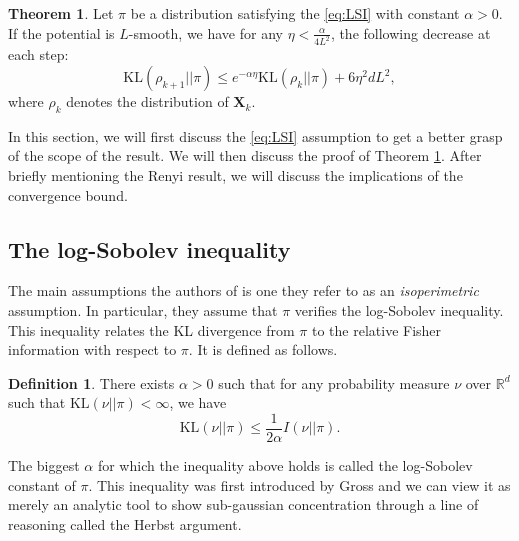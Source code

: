 \documentclass[11pt,twoside]{article}
\theoremstyle{definition}
\newtheorem{definition}{Definition}[section]
\newtheorem{theorem}{Theorem}[section]
\newcommand{\R}{\mathbb{R}}
\newcommand{\bX}{\mathbf{X}}
\newcommand{\KL}{\text{KL}}
\begin{document}
\begin{boxF}
\begin{theorem}
Let $\pi$ be a distribution satisfying the \eqref{eq:LSI} with constant $\alpha > 0$. If the potential is $L$-smooth, we have for any $\eta < \frac{\alpha}{4L^2}$, the following decrease at each step:
\[
\KL(\rho_{k+1} || \pi) \leq e^{-\alpha \eta}\KL(\rho_{k} || \pi) + 6\eta^2 d L^2,
\]
where $\rho_k$ denotes the distribution of $\bX_k$.
\label{thm:step}
\end{theorem}
\end{boxF}
In this section, we will first discuss the \eqref{eq:LSI} assumption to get a better grasp of the scope of the result. We will then discuss the proof of Theorem \ref{thm:step}. After briefly mentioning the Renyi result, we will discuss the implications of the convergence bound.

\subsection{The log-Sobolev inequality}

The main assumptions the authors of \cite{vempala_rapid_2019} is one they refer to as an \textit{isoperimetric} assumption. In particular, they assume that $\pi$ verifies the log-Sobolev inequality. This inequality relates the KL divergence from $\pi$ to the relative Fisher information with respect to $\pi$. It is defined as follows.

\begin{definition}
  There exists $\alpha >0$ such that for any probability measure $\nu$ over $\R^d$ such that $\KL(\nu || \pi) < \infty$, we have
  \begin{equation}
  \KL(\nu || \pi) \leq \frac{1}{2\alpha} I(\nu || \pi).
  \label{eq:LSI}
  \tag{LSI}
  \end{equation}
\end{definition}

The biggest $\alpha$ for which the inequality above holds is called the log-Sobolev constant of $\pi$. This inequality was first introduced by Gross \cite{gross_logarithmic_1975} and we can view it as merely an analytic tool to show sub-gaussian concentration through a line of reasoning called the Herbst argument. 
\end{document}
